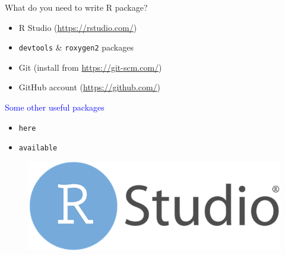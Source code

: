 \documentclass[
  ignorenonframetext,
]{beamer}
\providecommand{\tightlist}{%
  \setlength{\itemsep}{0pt}\setlength{\parskip}{0pt}}
\begin{document}
\begin{frame}[fragile]{What do you need to write R package?}
\protect\hypertarget{what-do-you-need-to-write-r-package}{}

\begin{itemize}
\tightlist
\item
  R Studio (\url{https://rstudio.com/})
\item
  \texttt{devtools} \& \texttt{roxygen2} packages
\item
  Git (install from \url{https://git-scm.com/})
\item
  GitHub account (\url{https://github.com/})
\end{itemize}

\textcolor{blue}{Some other useful packages}

\begin{itemize}
\tightlist
\item
  \texttt{here}
\item
  \texttt{available}
\end{itemize}

\begin{figure}
  \includegraphics[scale=0.2]{slides_files/figure-beamer/Rstudio.png}
\end{figure}

\end{frame}
\end{document}

